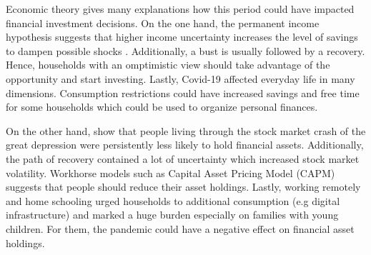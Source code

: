 \documentclass[ProjectABM]{subfiles}
\begin{document}


Economic theory gives many explanations how this period could have impacted financial investment decisions. On the one hand, the permanent income hypothesis suggests that higher income uncertainty increases the level of savings to dampen possible shocks \citep{campbell1986_PIH}. Additionally, a bust is usually followed by a recovery. Hence, households with an omptimistic view should take advantage of the opportunity and start investing. Lastly, Covid-19 affected everyday life in many dimensions. Consumption restrictions could have increased savings and free time for some households which could be used to organize personal finances. 

On the other hand, \cite{malmendier_2011} show that people living through the stock market crash of the great depression were persistently less likely to hold financial assets. Additionally, the path of recovery contained a lot of uncertainty which increased stock market volatility. Workhorse models such as Capital Asset Pricing Model (CAPM) suggests that people should reduce their asset holdings. Lastly, working remotely and home schooling urged households to additional consumption (e.g digital infrastructure) and marked a huge burden especially on families with young children. For them, the pandemic could have a negative effect on financial asset holdings.


\end{document}
